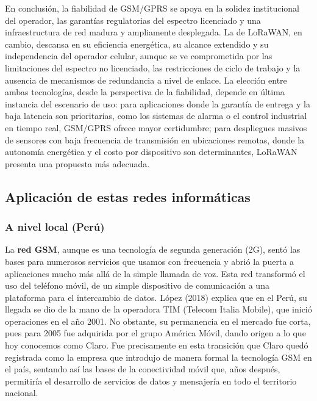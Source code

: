 \documentclass[12pt,a4paper]{article}
\begin{document}
	En conclusión, la fiabilidad de GSM/GPRS se apoya en la solidez institucional del operador, las garantías regulatorias del espectro licenciado y una infraestructura de red madura y ampliamente desplegada. La de LoRaWAN, en cambio, descansa en su eficiencia energética, su alcance extendido y su independencia del operador celular, aunque se ve comprometida por las limitaciones del espectro no licenciado, las restricciones de ciclo de trabajo y la ausencia de mecanismos de redundancia a nivel de enlace. La elección entre ambas tecnologías, desde la perspectiva de la fiabilidad, depende en última instancia del escenario de uso: para aplicaciones donde la garantía de entrega y la baja latencia son prioritarias, como los sistemas de alarma o el control industrial en tiempo real, GSM/GPRS ofrece mayor certidumbre; para despliegues masivos de sensores con baja frecuencia de transmisión en ubicaciones remotas, donde la autonomía energética y el costo por dispositivo son determinantes, LoRaWAN presenta una propuesta más adecuada.

	\subsection{Aplicación de estas redes informáticas}
	\subsubsection{A nivel local (Perú)}
	
	La \textbf{red GSM}, aunque es una tecnología de segunda generación (2G), sentó las bases para numerosos servicios que usamos con frecuencia y abrió la puerta a aplicaciones mucho más allá de la simple llamada de voz. Esta red transformó el uso del teléfono móvil, de un simple dispositivo de comunicación a una plataforma para el intercambio de datos. López (2018) explica que en el Perú, su llegada se dio de la mano de la operadora TIM (Telecom Italia Mobile), que inició operaciones en el año 2001. No obstante, su permanencia en el mercado fue corta, pues para 2005 fue adquirida por el grupo América Móvil, dando origen a lo que hoy conocemos como Claro. Fue precisamente en esta transición que Claro quedó registrada como la empresa que introdujo de manera formal la tecnología GSM en el país, sentando así las bases de la conectividad móvil que, años después, permitiría el desarrollo de servicios de datos y mensajería en todo el territorio nacional. \\
	
\end{document}
